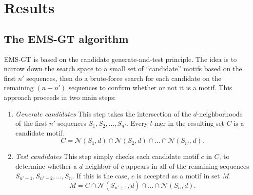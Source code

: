 \documentclass{acm_proc_article-sp}
\begin{document}
\vspace{-3mm}		
\section{Results}
	\subsection{The EMS-GT algorithm}
		EMS-GT is based on the candidate generate-and-test principle. The idea is to narrow down the search space to a small set of ``candidate'' motifs based on the first $n'$ sequences, then do a brute-force search for each candidate on the remaining $(n - n')$ sequences to confirm whether or not it is a motif. This approach proceeds in two main steps:
		\vspace{-3mm}
		\begin{enumerate} %
			\item {\em Generate candidates}\newline
			This step takes the intersection of the $d$-neighborhoods of the first $n'$ sequences $S_{1},S_{2},...,S_{n'}$. Every $l$-mer in the resulting set $C$ is a candidate motif.\newline
			\vspace{-3mm}
			\begin{equation}
			C = \mathcal{N}(S_{1}, d) \cap \mathcal{N}(S_{2}, d) \cap...\cap \mathcal{N}(S_{n'}, d).
			\end{equation} %
			\item {\em Test candidates}\newline
			This step simply checks each candidate motif $c$ in $C$, to determine whether a $d$-neighbor of $c$ appears in all of the remaining sequences $S_{n'+1},S_{n'+2},...,S_{n}$. If this is the case, $c$ is accepted as a motif in set $M$.\newline
			\vspace{-3mm}
			\begin{equation}
			M = C \cap \mathcal{N}(S_{n'+1}, d) \cap...\cap \mathcal{N}(S_{n}, d).
			\end{equation} %
			\end{enumerate}
		\newpage
\end{document}
